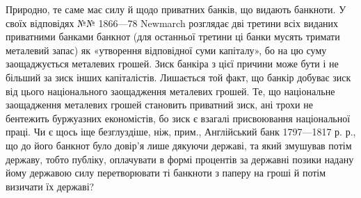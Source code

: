 Природно, те саме має силу й щодо приватних банків, що видають банкноти.
У своїх відповідях №№ 1866—78 Newmarch розглядає дві третини всіх виданих
приватними банками банкнот (для останньої третини ці банки мусять тримати
металевий запас) як «утворення відповідної суми капіталу», бо на цю суму заощаджується
металевих грошей. Зиск банкіра з цієї причини може бути і не більший
за зиск інших капіталістів. Лишається той факт, що банкір добуває зиск від цього
національного заощадження металевих грошей. Те, що національне заощадження
металевих грошей становить приватний зиск, ані трохи не бентежить буржуазних
економістів, бо зиск є взагалі присвоювання національної праці. Чи є щось
іще безглуздіше, ніж, прим., Англійський банк 1797—1817 р. р., що до його
банкнот було довір’я лише дякуючи державі, та який змушував потім державу,
тобто публіку, оплачувати в формі процентів за державні позики надану йому
державою силу перетворювати ті банкноти з паперу на гроші й потім визичати
їх державі?
